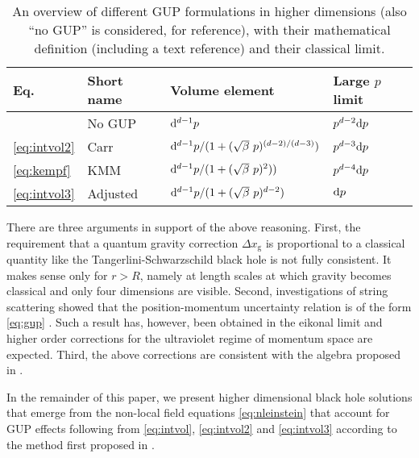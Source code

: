 \begin{table}[b]
	\begin{tabularx}{\linewidth}{llll}
		\firsthline
		Eq. & Short name  & Volume element & Large $p$ limit \\
		\hline 
		& No GUP   & $\mathrm{d}^{d-1} p$           & $p^{d-2} \mathrm{d} p$ \\
		\eqref{eq:intvol2} & Carr     & $\mathrm{d}^{d-1} p / (1 + (\sqrt \beta~p)^{(d-2)/(d-3)})$ & $p^{d-3} \mathrm{d} p$ \\
		\eqref{eq:kempf} & KMM      & $\mathrm{d}^{d-1} p / (1 + (\sqrt \beta~p)^2)   )$ & $p^{d-4} \mathrm{d} p$  \\
		\eqref{eq:intvol3} & Adjusted & $\mathrm{d}^{d-1} p / (1 + (\sqrt \beta~p)^{d-2})$ & $\mathrm{d} p$ \\
		\hline
	\end{tabularx}
	\caption[
	  Overview of different GUP formulations in higher dimensions
	]{
	  An overview of different GUP formulations in higher dimensions
	  (also ``no GUP'' is considered, for reference), with their 
	  mathematical definition (including a text reference) and their
	  classical limit.
	}
\end{table}

There are three arguments in support of the above reasoning. First,
the requirement that a  quantum gravity correction
$\Delta x_\mathrm{g}$ is proportional to a classical quantity like
the Tangerlini-Schwarzschild black hole is not fully consistent.
It makes sense only for $r > R$, namely at length scales at which
gravity becomes classical and only four dimensions are visible. 
Second, investigations of string scattering showed that the
position-momentum uncertainty relation is of the form \eqref{eq:gup}
\cite{ACV89,ACV93}. Such a result has, however, been obtained
in the eikonal limit and higher order corrections for the ultraviolet
regime of momentum space are expected. Third, the above corrections
are consistent with the algebra proposed in \cite{Maz12,DMS15,Maz15}.

In the remainder of this paper, we present higher dimensional black
hole solutions that emerge from the non-local field equations
\eqref{eq:nleinstein} that account for GUP effects following from
\eqref{eq:intvol}, \eqref{eq:intvol2} and \eqref{eq:intvol3}
according to the method first proposed in \cite{IMN13}.


